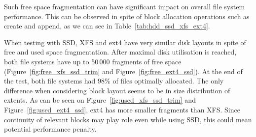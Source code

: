 \documentclass[
  color, %
  table, %
  lof,   %
  lot,   %
]{fithesis3}
\begin{document}
Such free space fragmentation can have significant impact on overall file system performance. This can be observed in spite of block allocation operations such as create and append, as we can see in Table~\ref{tab:hdd_ssd_xfs_ext4}.


When testing with SSD, XFS and ext4 have very similar disk layouts in spite of free and used space fragmentation. After maximal disk utilisation is reached, both file systems have up to 50\,000 fragments of free space (Figure~\ref{fig:free_xfs_ssd_trim} and Figure~\ref{fig:free_ext4_ssd}). At the end of the test, both file systems had 98\% of files optimally allocated. The only difference when considering block layout seems to be in size distribution of extents. As can be seen on Figure~\ref{fig:used_xfs_ssd_trim} and Figure~\ref{fig:used_ext4_ssd}, ext4 has more smaller fragments than XFS. Since continuity of relevant blocks may play role even while using SSD, this could mean potential performance penalty.
\end{document}
